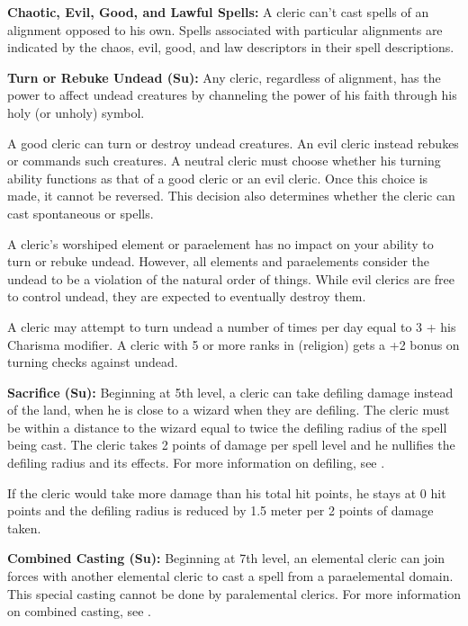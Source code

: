 \textbf{Chaotic, Evil, Good, and Lawful Spells:} A cleric can't cast spells of an alignment opposed to his own. Spells associated with particular alignments are indicated by the chaos, evil, good, and law descriptors in their spell descriptions.

\textbf{Turn or Rebuke Undead (Su):} Any cleric, regardless of alignment, has the power to affect undead creatures by channeling the power of his faith through his holy (or unholy) symbol.

A good cleric can turn or destroy undead creatures. An evil cleric instead rebukes or commands such creatures. A neutral cleric must choose whether his turning ability functions as that of a good cleric or an evil cleric. Once this choice is made, it cannot be reversed. This decision also determines whether the cleric can cast spontaneous  or  spells.

A cleric's worshiped element or paraelement has no impact on your ability to turn or rebuke undead. However, all elements and paraelements consider the undead to be a violation of the natural order of things. While evil clerics are free to control undead, they are expected to eventually destroy them.

A cleric may attempt to turn undead a number of times per day equal to 3 + his Charisma modifier. A cleric with 5 or more ranks in  (religion) gets a +2 bonus on turning checks against undead.

\textbf{Sacrifice (Su):} Beginning at 5th level, a cleric can take defiling damage instead of the land, when he is close to a wizard when they are defiling. The cleric must be within a distance to the wizard equal to twice the defiling radius of the spell being cast. The cleric takes 2 points of damage per spell level and he nullifies the defiling radius and its effects. For more information on defiling, see .

If the cleric would take more damage than his total hit points, he stays at 0 hit points and the defiling radius is reduced by 1.5 meter per 2 points of damage taken.

\textbf{Combined Casting (Su):} Beginning at 7th level, an elemental cleric can join forces with another elemental cleric to cast a spell from a paraelemental domain. This special casting cannot be done by paralemental clerics. For more information on combined casting, see .

